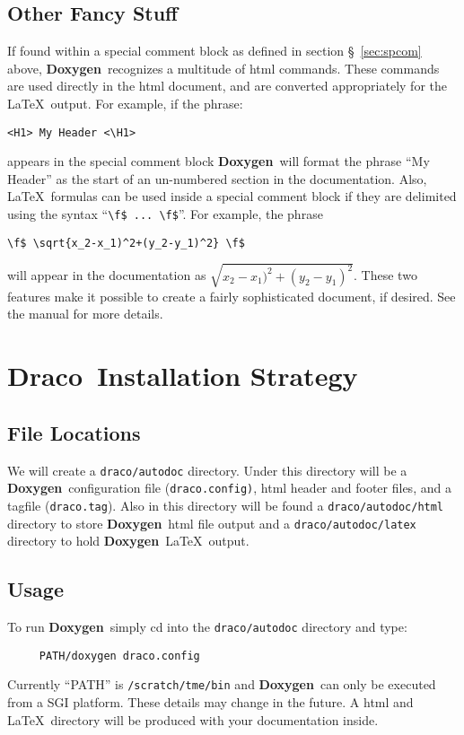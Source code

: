 \documentclass[11pt]{nmemo}
\newcommand{\draco}{{\normalfont\sffamily Draco}}
\newcommand{\doxy}{{\normalfont\bfseries Doxygen}}
\begin{document}
\subsection{Other Fancy Stuff}

If found within a special comment block 
as defined in section \S~\ref{sec:spcom} above, \doxy\ 
recognizes a multitude of html commands. These
commands are used directly in the html document, and are converted appropriately for
the \LaTeX\ output. 
For example, if the phrase: 
\begin{verbatim}
<H1> My Header <\H1>
\end{verbatim} appears in the special comment
block \doxy\ will format the phrase ``My Header'' as the start of an
un-numbered section in the documentation. 
Also, \LaTeX\ formulas can be used inside a special
comment block if they are delimited using the syntax ``\verb+\f$ ... \f$+''.
For example, the phrase 
\begin{verbatim}
\f$ \sqrt{x_2-x_1)^2+(y_2-y_1)^2} \f$ 
\end{verbatim}  will appear in the
documentation as $\sqrt{x_2-x_1)^2+(y_2-y_1)^2}$.
These two
features make it possible to create a fairly sophisticated document, if desired.
See the manual for more details.



\section{\draco\ Installation Strategy}
\label{sec:draco}

\subsection{File Locations}
We will create a \texttt{draco/autodoc} directory. Under this directory
will be a \doxy\ configuration file (\texttt{draco.config)}, html header 
and footer files,
and a tagfile (\texttt{draco.tag}). Also in this directory will be found
a \texttt{draco/autodoc/html} directory to store \doxy\ html file
output and a \texttt{draco/autodoc/latex}
directory to hold \doxy\ \LaTeX\ output. 

\subsection{Usage}
To run \doxy\ simply cd into the \texttt{draco/autodoc} directory and type:
\begin{verbatim} 
     PATH/doxygen draco.config
\end{verbatim}
Currently ``PATH'' is \texttt{/scratch/tme/bin} and \doxy\
can only be executed from a SGI platform. These details may
change in the future. 
A html and \LaTeX\ directory will be produced with your documentation 
inside. 
\end{document}
